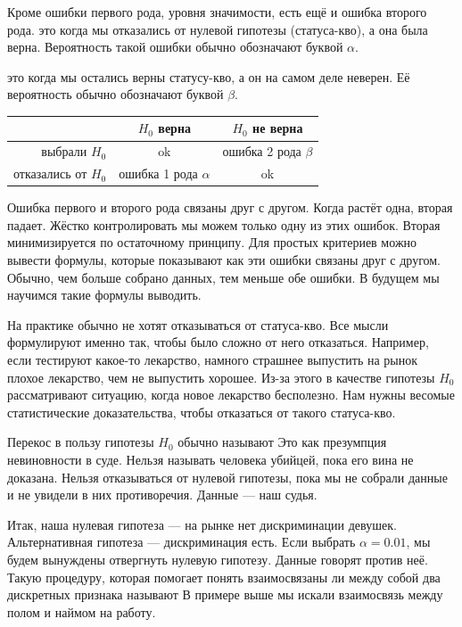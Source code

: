 \documentclass[12pt, a4paper, oneside]{article}
\begin{document}
Кроме ошибки первого рода, уровня значимости, есть ещё и ошибка второго рода.  это когда мы отказались от нулевой гипотезы (статуса-кво), а она была верна. Вероятность такой ошибки обычно обозначают буквой $\alpha$. 

 это когда мы остались верны статусу-кво, а он на самом деле неверен. Её вероятность обычно обозначают буквой $\beta$. 

\begin{center}
	\begin{tabular}{|r|c|c|}
	\hline
	                    & $H_0$ верна & $H_0$ не верна \\  \hline 
	выбрали $H_0$       &  ok &  ошибка 2 рода  $\beta$ \\      \hline 
	отказались от $H_0$ &  ошибка 1 рода $\alpha$ &  ok \\      \hline 
	\end{tabular}
\end{center}

Ошибка первого и второго рода связаны друг с другом. Когда растёт одна, вторая падает. Жёстко контролировать мы можем только одну из этих ошибок. Вторая минимизируется по остаточному принципу. Для простых критериев можно вывести формулы, которые показывают как эти ошибки связаны друг с другом. Обычно, чем больше собрано данных, тем меньше обе ошибки. В будущем мы научимся такие формулы выводить. 

На практике обычно не хотят отказываться от статуса-кво. Все мысли формулируют именно так, чтобы было сложно от него отказаться. Например, если тестируют какое-то лекарство, намного страшнее выпустить на рынок плохое лекарство, чем не выпустить хорошее. Из-за этого в качестве гипотезы $H_0$ рассматривают ситуацию, когда новое лекарство бесполезно. Нам нужны весомые статистические доказательства, чтобы отказаться от такого статуса-кво. 

Перекос в пользу гипотезы $H_0$ обычно называют  Это как презумпция невиновности в суде.  Нельзя называть человека убийцей, пока его вина не доказана. Нельзя отказываться от нулевой гипотезы, пока мы не собрали данные и не увидели в них противоречия. Данные --- наш судья. 

Итак, наша нулевая гипотеза --- на рынке нет дискриминации девушек. Альтернативная гипотеза --- дискриминация есть. Если выбрать $\alpha = 0.01$, мы будем вынуждены отвергнуть нулевую гипотезу. Данные говорят против неё. Такую процедуру, которая помогает понять взаимосвязаны ли между собой два дискретных признака называют  В примере выше мы искали взаимосвязь между полом и наймом на работу. 
\end{document}
